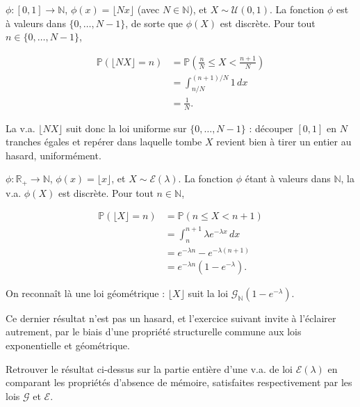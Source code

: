 \begin{exemple}
$\phi : [0, 1] \to \mathbb{N}$, $\phi(x) = \lfloor Nx \rfloor$ (avec $N \in \mathbb{N}$), et $X \sim \mathcal{U}(0, 1)$. La fonction $\phi$ est à valeurs dans $\{0, \dots, N - 1\}$, de sorte que $\phi(X)$ est discrète. Pour tout $n \in \{0, \dots, N - 1\}$,

\begin{align*}
\mathbb{P}(\lfloor NX \rfloor = n) &= \mathbb{P}\!\left(\tfrac{n}{N} \leq X < \tfrac{n + 1}{N}\right) \\
&= \int_{n/N}^{(n+1)/N} 1 \, dx \\
&= \frac{1}{N}.
\end{align*}

La v.a. $\lfloor NX \rfloor$ suit donc la loi uniforme sur $\{0, \dots, N - 1\}$ : découper $[0, 1]$ en $N$ tranches égales et repérer dans laquelle tombe $X$ revient bien à tirer un entier au hasard, uniformément.
\end{exemple}

\begin{exemple}
$\phi : \mathbb{R}_+ \to \mathbb{N}$, $\phi(x) = \lfloor x \rfloor$, et $X \sim \mathcal{E}(\lambda)$. La fonction $\phi$ étant à valeurs dans $\mathbb{N}$, la v.a. $\phi(X)$ est discrète. Pour tout $n \in \mathbb{N}$,

\begin{align*}
\mathbb{P}(\lfloor X \rfloor = n) &= \mathbb{P}(n \leq X < n + 1) \\
&= \int_n^{n+1} \lambda e^{-\lambda x} \, dx \\
&= e^{-\lambda n} - e^{-\lambda(n+1)} \\
&= e^{-\lambda n}(1 - e^{-\lambda}).
\end{align*}

On reconnaît là une loi géométrique : $\lfloor X \rfloor$ suit la loi $\mathcal{G}_{\mathbb{N}}(1 - e^{-\lambda})$.
\end{exemple}

Ce dernier résultat n'est pas un hasard, et l'exercice suivant invite à l'éclairer autrement, par le biais d'une propriété structurelle commune aux lois exponentielle et géométrique.

\begin{exercice}
Retrouver le résultat ci-dessus sur la partie entière d'une v.a. de loi $\mathcal{E}(\lambda)$ en comparant les propriétés d'absence de mémoire, satisfaites respectivement par les lois $\mathcal{G}$ et $\mathcal{E}$.
\end{exercice}

